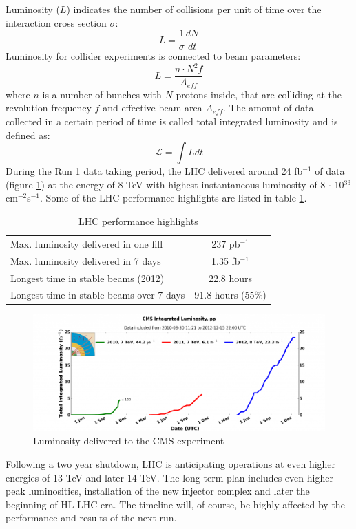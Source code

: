 Luminosity ($L$) indicates the number of collisions per unit of time over the interaction cross section $\sigma$:
\begin{equation}
L=\frac{1}{\sigma}\frac{dN}{dt}
\end{equation}
Luminosity for collider experiments is connected to beam parameters:
\begin{equation}
L=\frac{n\cdot N^2 f}{A_{eff}}
\end{equation}
where $n$ is a number of bunches with $N$ protons inside, that are colliding at the revolution frequency $f$ and effective beam area $A_{eff}$. The amount of data collected in a certain period of time is called total integrated luminosity and is defined as:
\begin{equation}
\mathcal{L} = \int L dt
\end{equation} 
During the Run 1 data taking period, the LHC delivered around 24 fb$^{-1}$ of data (figure \ref{fig:LHC_lumi}) at the energy of 8 TeV with highest instantaneous luminosity of 8 $\cdot$ 10$^33$ cm$^{-2}$s$^{-1}$. Some of the LHC performance highlights are listed in table \ref{tab:LHC_highlights}.
\begin{table}[h]
\centering
  \caption{LHC performance highlights}
  \label{tab:LHC_highlights}
  \begin{tabular}{ l  c }
      \hline
      \hline
      Max. luminosity delivered in one fill & 237 pb$^{-1}$  \\
      Max. luminosity delivered in 7 days & 1.35 fb$^{-1}$  \\
      Longest time in stable beams (2012) & 22.8 hours \\
      Longest time in stable beams over 7 days & 91.8 hours (55$\%$) \\
      \hline
      \hline 
  \end{tabular}
\end{table}
\begin{figure}[htbp]
	\centering
		\includegraphics[width=\textwidth]{Figures/lumi.png}
	\caption[Luminosity delivered to the CMS experiment]{Luminosity delivered to the CMS experiment}
	\label{fig:LHC_lumi}
\end{figure} 
\par Following a two year shutdown, LHC is anticipating operations at even higher energies of 13 TeV and later 14 TeV. The long term plan includes even higher peak luminosities, installation of the new injector complex and later the beginning of HL-LHC era. The timeline will, of course, be highly affected by the performance and results of the next run.